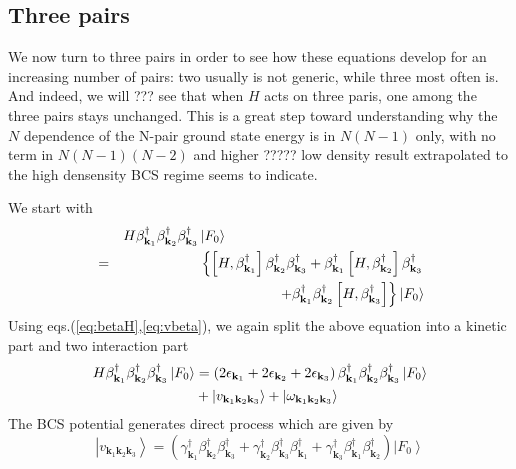 \documentclass[aps,prb,superscriptaddress,showpacs,reprint,lengthcheck]{revtex4-1}
\begin{document}
\subsection{Three pairs}

We now turn to three pairs in order to see how these equations develop for an
increasing number of pairs: two usually is not generic, while three most often is.  And indeed, we will ??? see that when $H$ acts on three paris, one among the three pairs stays unchanged.   This is a great step toward understanding why the $N$ dependence of the N-pair ground state energy is in $N(N-1)$ only, with no term in $N(N-1)(N-2)$ and higher ????? low density result extrapolated to the high densensity BCS regime seems to indicate.  


We start with 
\begin{eqnarray}  \label{eq:SchThree}
&&H\beta^{\dagger}_{\mathbf{k} _1}\beta^{\dagger}_{\mathbf{k}
_2}\beta^{\dagger}_{\mathbf{k} _3}\left|F_0\right>  \hspace{5cm}
\nonumber\\
&=&\left\{\left[H,\beta^{\dagger}_{\mathbf{k} _1}\right]  \beta^{\dagger}_{%
\mathbf{k} _2}\beta^{\dagger}_{\mathbf{k} _3}+\beta^{\dagger}_{\mathbf{k} _1}%
\left[H,\beta^{\dagger}_{\mathbf{k} _2}\right]  \beta^{\dagger}_{\mathbf{k}
_3}\right.
\nonumber\\ &&\left.
+\beta^{\dagger}_{\mathbf{k} _1}\beta^{\dagger}_{\mathbf{k} _2}\left[%
H,\beta^{\dagger}_{\mathbf{k} _3}\right]  \right\}
\left|F_0\right> 
\end{eqnarray}%
 Using eqs.(\ref{eq:betaH},\ref{eq:vbeta}), we again  split the above equation into a kinetic part and two interaction part
\begin{equation}  \label{eq:SchThree2}
\begin{split}
H\beta^{\dagger}_{\mathbf{k} _1}\beta^{\dagger}_{\mathbf{k}
_2}\beta^{\dagger}_{\mathbf{k} _3}\left|F_0\right>   &=\left(2\epsilon_{%
\mathbf{k} _1}+2\epsilon_{\mathbf{k} _2}+2\epsilon_{\mathbf{k} _3}\right)
\beta^{\dagger}_{\mathbf{k} _1}\beta^{\dagger}_{\mathbf{k}
_2}\beta^{\dagger}_{\mathbf{k} _3}\left|F_0\right>   \\
&+\left|v_{\mathbf{k} _1\mathbf{k} _2\mathbf{k} _3}\right> +\left|\omega_{\mathbf{k} _1\mathbf{k} _2\mathbf{k} _3}\right> 
\end{split}%
\end{equation}
The  BCS potential generates direct process which are given by 
\begin{equation}  \label{eq:vThree}
\left|v_{\mathbf{k} _1\mathbf{k} _2\mathbf{k} _3}\right> =
\left(\gamma^{\dagger}_{\mathbf{k} _1}\beta^{\dagger}_{\mathbf{k}
_2}\beta^{\dagger}_{\mathbf{k} _3}+\gamma^{\dagger}_{\mathbf{k}
_2}\beta^{\dagger}_{\mathbf{k} _3}\beta^{\dagger}_{\mathbf{k}
_1}+\gamma^{\dagger}_{\mathbf{k} _3}\beta^{\dagger}_{\mathbf{k}
_1}\beta^{\dagger}_{\mathbf{k} _2}\right) \left|F_0\right>   
\end{equation}
\end{document}
